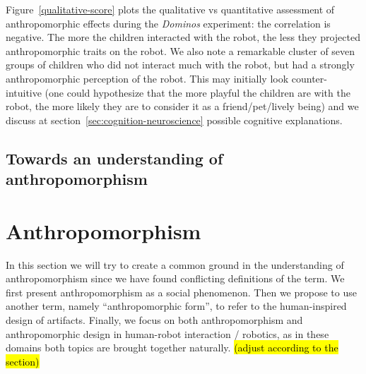 \documentclass{frontiersSCNS} %
\begin{document}
Figure~\ref{qualitative-score} plots the qualitative vs quantitative assessment of
anthropomorphic effects during the \emph{Dominos} experiment: the correlation is
negative. The more the children interacted with the robot, the less they
projected anthropomorphic traits on the robot. We also note a remarkable cluster
of seven groups of children who did not interact much with the robot, but had a
strongly anthropomorphic perception of the robot. This may initially look
counter-intuitive (one could hypothesize that the more playful the children are
with the robot, the more likely they are to consider it as a friend/pet/lively
being) and we discuss at section~\ref{sec:cognition-neuroscience} possible
cognitive explanations.

\subsection{Towards an understanding of anthropomorphism}



%
%
%
%
%
%
%
%
%

\section{Anthropomorphism}
\label{sec:anthropomorphism}

In this section we will try to create a common ground in the understanding of anthropomorphism since we have found conflicting definitions of the term. We first present anthropomorphism as a social phenomenon. Then we propose to use another term, namely ``anthropomorphic form'', to refer to the human-inspired design of artifacts. Finally, we focus on both anthropomorphism and anthropomorphic design in human-robot interaction / robotics, as in these domains both topics are brought together naturally. \hl{(adjust according to the section)}
\end{document}
